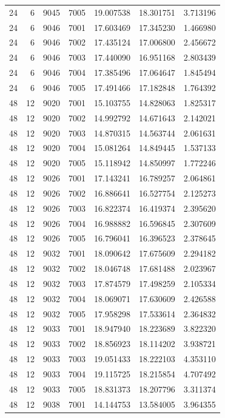 \begin{table}
\begin{tabular}{rrrrrrr}
24 & 6 & 9045 & 7005 & 19.007538 & 18.301751 & 3.713196 \\
24 & 6 & 9046 & 7001 & 17.603469 & 17.345230 & 1.466980 \\
24 & 6 & 9046 & 7002 & 17.435124 & 17.006800 & 2.456672 \\
24 & 6 & 9046 & 7003 & 17.440090 & 16.951168 & 2.803439 \\
24 & 6 & 9046 & 7004 & 17.385496 & 17.064647 & 1.845494 \\
24 & 6 & 9046 & 7005 & 17.491466 & 17.182848 & 1.764392 \\
48 & 12 & 9020 & 7001 & 15.103755 & 14.828063 & 1.825317 \\
48 & 12 & 9020 & 7002 & 14.992792 & 14.671643 & 2.142021 \\
48 & 12 & 9020 & 7003 & 14.870315 & 14.563744 & 2.061631 \\
48 & 12 & 9020 & 7004 & 15.081264 & 14.849445 & 1.537133 \\
48 & 12 & 9020 & 7005 & 15.118942 & 14.850997 & 1.772246 \\
48 & 12 & 9026 & 7001 & 17.143241 & 16.789257 & 2.064861 \\
48 & 12 & 9026 & 7002 & 16.886641 & 16.527754 & 2.125273 \\
48 & 12 & 9026 & 7003 & 16.822374 & 16.419374 & 2.395620 \\
48 & 12 & 9026 & 7004 & 16.988882 & 16.596845 & 2.307609 \\
48 & 12 & 9026 & 7005 & 16.796041 & 16.396523 & 2.378645 \\
48 & 12 & 9032 & 7001 & 18.090642 & 17.675609 & 2.294182 \\
48 & 12 & 9032 & 7002 & 18.046748 & 17.681488 & 2.023967 \\
48 & 12 & 9032 & 7003 & 17.874579 & 17.498259 & 2.105334 \\
48 & 12 & 9032 & 7004 & 18.069071 & 17.630609 & 2.426588 \\
48 & 12 & 9032 & 7005 & 17.958298 & 17.533614 & 2.364832 \\
48 & 12 & 9033 & 7001 & 18.947940 & 18.223689 & 3.822320 \\
48 & 12 & 9033 & 7002 & 18.856923 & 18.114202 & 3.938721 \\
48 & 12 & 9033 & 7003 & 19.051433 & 18.222103 & 4.353110 \\
48 & 12 & 9033 & 7004 & 19.115725 & 18.215854 & 4.707492 \\
48 & 12 & 9033 & 7005 & 18.831373 & 18.207796 & 3.311374 \\
48 & 12 & 9038 & 7001 & 14.144753 & 13.584005 & 3.964355 \\

\end{tabular}
\end{table}
